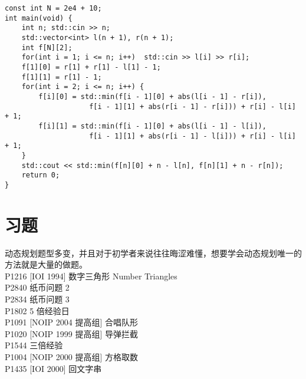 \documentclass{beamer}
\begin{document}
\begin{frame}[fragile]
\begin{onlyenv}
\begin{verbatim}
const int N = 2e4 + 10;
int main(void) {
    int n; std::cin >> n;
    std::vector<int> l(n + 1), r(n + 1);
    int f[N][2];
    for(int i = 1; i <= n; i++)  std::cin >> l[i] >> r[i];
    f[1][0] = r[1] + r[1] - l[1] - 1;
    f[1][1] = r[1] - 1;
    for(int i = 2; i <= n; i++) {
        f[i][0] = std::min(f[i - 1][0] + abs(l[i - 1] - r[i]),
                    f[i - 1][1] + abs(r[i - 1] - r[i])) + r[i] - l[i] + 1;
        f[i][1] = std::min(f[i - 1][0] + abs(l[i - 1] - l[i]),
                    f[i - 1][1] + abs(r[i - 1] - l[i])) + r[i] - l[i] + 1;
    }
    std::cout << std::min(f[n][0] + n - l[n], f[n][1] + n - r[n]);
    return 0;
}
\end{verbatim}
\end{onlyenv}
\end{frame}
\section{习题}
\begin{frame}
动态规划题型多变，并且对于初学者来说往往晦涩难懂，想要学会动态规划唯一的方法就是大量的做题。\\ 
P1216	[IOI 1994] 数字三角形 Number Triangles\\
P2840	纸币问题 2\\ 
P2834	纸币问题 3\\
P1802	5 倍经验日\\
P1091	[NOIP 2004 提高组] 合唱队形\\
P1020	[NOIP 1999 提高组] 导弹拦截\\
P1544	三倍经验\\
P1004	[NOIP 2000 提高组] 方格取数\\
P1435	[IOI 2000] 回文字串\\ 
\end{frame}
\end{document}
